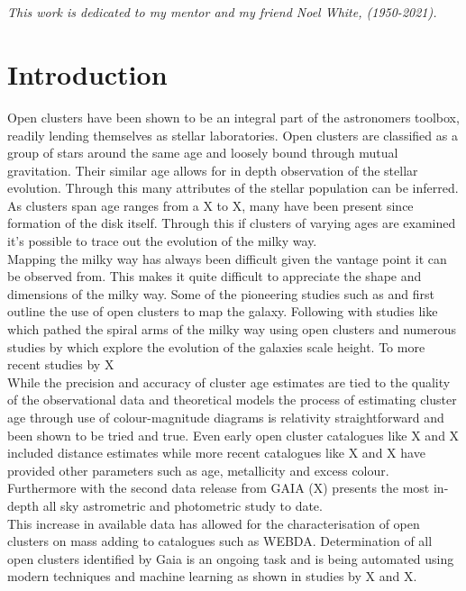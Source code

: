 \section*{}


\begin{center}
    \textit{This work is dedicated to my mentor and my friend Noel White, (1950-2021).}
\end{center}

\section{Introduction} \label{sec:intro}

Open clusters have been shown to be an integral part of the astronomers toolbox, readily lending themselves as stellar laboratories. Open clusters are classified as a group of stars around the same age and loosely bound through mutual gravitation. 
Their similar age allows for in depth observation of the stellar evolution.  Through this many attributes of the stellar population can be inferred. As clusters span age ranges from a X to X, many have been present since formation of the disk itself. Through this if clusters of varying ages are examined it's possible to trace out the evolution of the milky way.  \\

Mapping the milky way has always been difficult given the vantage point it can be observed from. This makes it quite difficult to appreciate the shape and dimensions of the milky way. Some of the pioneering studies such as \cite{1785RSPT...75..213H,1918ApJ....48..154S} and \cite{1930LicOB..14..154T} first outline the use of open clusters to map the galaxy. Following with studies like \cite{1970IAUS...38..205B} which pathed the spiral arms of the milky way using open clusters and numerous studies by \cite{1958ZA.....46..176V} which explore the evolution of the galaxies scale height. To more recent studies by X \\

While the precision and accuracy of cluster age estimates are tied to the quality of the observational data and theoretical models the process of estimating cluster age through use of colour-magnitude diagrams is relativity straightforward  and been shown to be tried and true. Even early open cluster catalogues like X and X included distance estimates while more recent catalogues like X and X have provided other parameters such as age, metallicity  and excess colour. Furthermore with the second data release from GAIA (X) presents the most in-depth all sky astrometric and photometric study to date. \\
This increase in available data has allowed for the characterisation of open clusters on mass adding to catalogues such as WEBDA. Determination of all open clusters identified by Gaia is an ongoing task and is being automated using modern techniques and machine learning as shown in studies by X and X. \\

